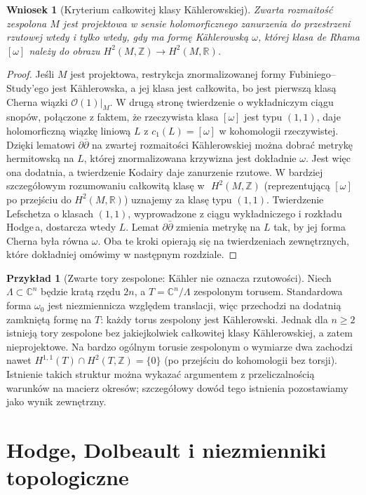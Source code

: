 \documentclass[11pt,a4paper,openany]{report}
\numberwithin{equation}{section}
\theoremstyle{plain}
\newtheorem{wniosek}[twierdzenie]{Wniosek}
\theoremstyle{definition}
\newtheorem{przyklad}[twierdzenie]{Przykład}
\theoremstyle{remark}
\newcommand{\Z}{\mathbb Z}
\newcommand{\R}{\mathbb R}
\newcommand{\C}{\mathbb C}
\begin{document}
\begin{wniosek}[Kryterium całkowitej klasy Kählerowskiej]
\label{wn:ga9-integral-kahler}
Zwarta rozmaitość zespolona $M$ jest projektowa
w sensie holomorficznego zanurzenia do przestrzeni
rzutowej wtedy i tylko wtedy, gdy ma formę Kählerowską
$\omega$, której klasa de Rhama $[\omega]$ należy
do obrazu $H^2(M,\Z)\to H^2(M,\R)$.
\end{wniosek}
\begin{proof}
Jeśli $M$ jest projektowa, restrykcja znormalizowanej
formy Fubiniego--Study'ego jest Kählerowska, a jej
klasa jest całkowita, bo jest pierwszą klasą Cherna
wiązki $\mathcal O(1)|_M$.
W drugą stronę twierdzenie o wykładniczym ciągu snopów,
połączone z faktem, że rzeczywista klasa $[\omega]$
jest typu $(1,1)$, daje holomorficzną wiązkę liniową
$L$ z $c_1(L)=[\omega]$ w kohomologii rzeczywistej.
Dzięki lematowi $\partial\bar\partial$ na zwartej
rozmaitości Kählerowskiej można dobrać metrykę
hermitowską na $L$, której znormalizowana krzywizna
jest dokładnie $\omega$. Jest więc ona dodatnia,
a twierdzenie Kodairy daje zanurzenie rzutowe.
W bardziej szczegółowym rozumowaniu całkowitą klasę w\,~$H^2(M,\Z)$
(reprezentującą $[\omega]$ po przejściu do $H^2(M,\R)$)
uznajemy za klasę typu $(1,1)$. Twierdzenie Lefschetza o klasach
$(1,1)$, wyprowadzone z ciągu wykładniczego i rozkładu Hodge\,a,
dostarcza wtedy $L$. Lemat $\partial\bar\partial$ zmienia
metrykę na $L$ tak, by jej forma Cherna była równa $\omega$.
Oba te kroki opierają się na twierdzeniach zewnętrznych,
które dokładniej omówimy w następnym rozdziale.
\end{proof}

\begin{przyklad}[Zwarte tory zespolone: Kähler nie oznacza rzutowości]
Niech $\Lambda\subset\C^n$ będzie kratą rzędu $2n$,
a $T=\C^n/\Lambda$ zespolonym torusem. Standardowa
forma $\omega_0$ jest niezmiennicza względem translacji,
więc przechodzi na dodatnią zamkniętą formę na $T$:
każdy torus zespolony jest Kählerowski.
Jednak dla $n\ge2$ istnieją tory zespolone bez
jakiejkolwiek całkowitej klasy Kählerowskiej,
a zatem nieprojektowe. Na bardzo ogólnym torusie
zespolonym o wymiarze dwa zachodzi nawet
$H^{1,1}(T)\cap H^2(T,\Z)=\{0\}$ (po przejściu do
kohomologii bez torsji). Istnienie takich struktur
można wykazać argumentem z przeliczalnością warunków
na macierz okresów; szczegółowy dowód tego istnienia
pozostawiamy jako wynik zewnętrzny.
\end{przyklad}

\section{Hodge, Dolbeault i niezmienniki topologiczne}
\label{sec:ga9-hodge}
\end{document}
